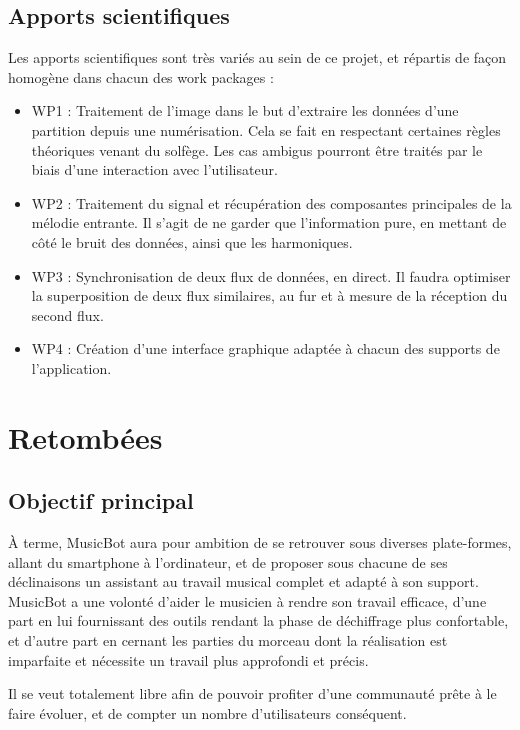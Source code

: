 \documentclass{article}
\begin{document}
\subsection{Apports scientifiques}
Les apports scientifiques sont très variés au sein de ce projet, et répartis de façon homogène dans chacun des work packages :

\begin{itemize}
\item WP1 : Traitement de l'image dans le but d'extraire les données d'une partition depuis une numérisation. Cela se fait en respectant certaines règles théoriques venant du solfège. Les cas ambigus pourront être traités par le biais d'une interaction avec l'utilisateur.

\item WP2 : Traitement du signal et récupération des composantes principales de la mélodie entrante. Il s'agit de ne garder que l'information pure, en mettant de côté le bruit des données, ainsi que les harmoniques.

\item WP3 : Synchronisation de deux flux de données, en direct. Il faudra optimiser la superposition de deux flux similaires, au fur et à mesure de la réception du second flux.

\item WP4 : Création d'une interface graphique adaptée à chacun des supports de l'application. 
\end{itemize}

\section{Retombées}
\subsection{Objectif principal}
À terme, MusicBot aura pour ambition de se retrouver sous diverses plate-formes, allant du smartphone à l'ordinateur, et de proposer sous chacune de ses déclinaisons un assistant au travail musical complet et adapté à son support. MusicBot a une volonté d'aider le musicien à rendre son travail efficace, d'une part en lui fournissant des outils rendant la phase de déchiffrage plus confortable, et d'autre part en cernant les parties du morceau dont la réalisation est imparfaite et nécessite un travail plus approfondi et précis.

Il se veut totalement libre afin de pouvoir profiter d'une communauté prête à le faire évoluer, et de compter un nombre d'utilisateurs conséquent.
\end{document}
